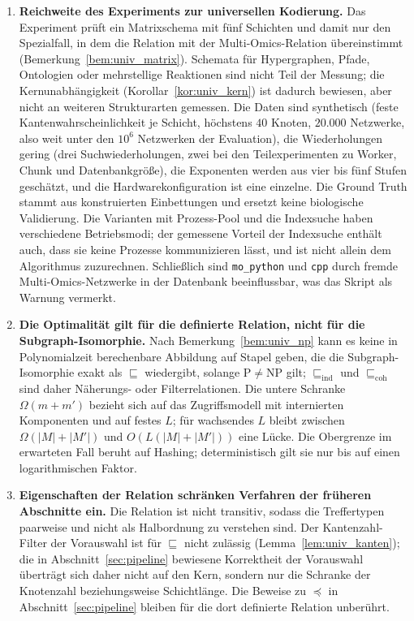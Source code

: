 \documentclass[a4paper,12pt, twoside]{report}
\theoremstyle{definition}
\begin{document}
\begin{enumerate}
	\item \textbf{Reichweite des Experiments zur universellen Kodierung.} Das Experiment prüft ein Matrixschema mit fünf Schichten und damit nur den Spezialfall, in dem die Relation mit der Multi-Omics-Relation übereinstimmt (Bemerkung~\ref{bem:univ_matrix}). Schemata für Hypergraphen, Pfade, Ontologien oder mehrstellige Reaktionen sind nicht Teil der Messung; die Kernunabhängigkeit (Korollar~\ref{kor:univ_kern}) ist dadurch bewiesen, aber nicht an weiteren Strukturarten gemessen. Die Daten sind synthetisch (feste Kantenwahrscheinlichkeit je Schicht, höchstens $40$ Knoten, $20.000$ Netzwerke, also weit unter den $10^6$ Netzwerken der Evaluation), die Wiederholungen gering (drei Suchwiederholungen, zwei bei den Teilexperimenten zu Worker, Chunk und Datenbankgröße), die Exponenten werden aus vier bis fünf Stufen geschätzt, und die Hardwarekonfiguration ist eine einzelne. Die Ground Truth stammt aus konstruierten Einbettungen und ersetzt keine biologische Validierung. Die Varianten mit Prozess-Pool und die Indexsuche haben verschiedene Betriebsmodi; der gemessene Vorteil der Indexsuche enthält auch, dass sie keine Prozesse kommunizieren lässt, und ist nicht allein dem Algorithmus zuzurechnen. Schließlich sind \texttt{mo\_python} und \texttt{cpp} durch fremde Multi-Omics-Netzwerke in der Datenbank beeinflussbar, was das Skript als Warnung vermerkt.
	\item \textbf{Die Optimalität gilt für die definierte Relation, nicht für die Subgraph-Isomorphie.} Nach Bemerkung~\ref{bem:univ_np} kann es keine in Polynomialzeit berechenbare Abbildung auf Stapel geben, die die Subgraph-Isomorphie exakt als $\sqsubseteq$ wiedergibt, solange $\mathrm{P}\neq\mathrm{NP}$ gilt; $\sqsubseteq_{\mathrm{ind}}$ und $\sqsubseteq_{\mathrm{coh}}$ sind daher Näherungs- oder Filterrelationen. Die untere Schranke $\Omega(m+m')$ bezieht sich auf das Zugriffsmodell mit internierten Komponenten und auf festes $L$; für wachsendes $L$ bleibt zwischen $\Omega(|M|+|M'|)$ und $O(L(|M|+|M'|))$ eine Lücke. Die Obergrenze im erwarteten Fall beruht auf Hashing; deterministisch gilt sie nur bis auf einen logarithmischen Faktor.
	\item \textbf{Eigenschaften der Relation schränken Verfahren der früheren Abschnitte ein.} Die Relation ist nicht transitiv, sodass die Treffertypen paarweise und nicht als Halbordnung zu verstehen sind. Der Kantenzahl-Filter der Vorauswahl ist für $\sqsubseteq$ nicht zulässig (Lemma~\ref{lem:univ_kanten}); die in Abschnitt~\ref{sec:pipeline} bewiesene Korrektheit der Vorauswahl überträgt sich daher nicht auf den Kern, sondern nur die Schranke der Knotenzahl beziehungsweise Schichtlänge. Die Beweise zu $\preceq$ in Abschnitt~\ref{sec:pipeline} bleiben für die dort definierte Relation unberührt.

\end{enumerate}
\end{document}
